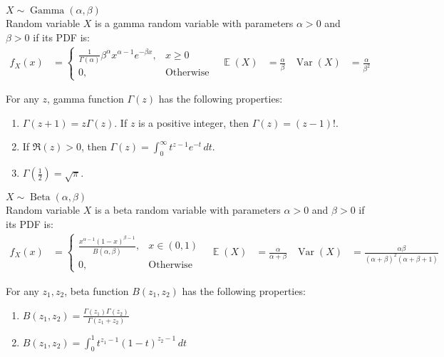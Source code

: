 \documentclass{huhtakm-template-book-v2}
\DeclareMathOperator{\E}{\mathbb{E}}
\DeclareMathOperator{\Var}{Var}
\DeclareMathOperator{\Gam}{Gamma}
\DeclareMathOperator{\Bet}{Beta}
\begin{document}
\newpage
\begin{eg} $X\sim\Gam(\alpha,\beta)$\\
	Random variable $X$ is a gamma random variable with parameters $\alpha>0$ and $\beta>0$ if its PDF is:
	\begin{align*}
		f_{X}(x)&=\begin{cases}
			\frac{1}{\Gamma(\alpha)}\beta^{\alpha}x^{\alpha-1}e^{-\beta x}, &x\geq 0\\
			0, &\text{Otherwise}
		\end{cases} & \E(X)&=\frac{\alpha}{\beta} & \Var(X)&=\frac{\alpha}{\beta^{2}}
	\end{align*}
\end{eg}
\begin{rem}
	For any $z$, gamma function $\Gamma(z)$ has the following properties:
	\begin{enumerate}
		\item $\Gamma(z+1)=z\Gamma(z)$. If $z$ is a positive integer, then $\Gamma(z)=(z-1)!$.
		\item If $\Re(z)>0$, then $\Gamma(z)=\int_{0}^{\infty}t^{z-1}e^{-t}\,dt$.
		\item $\Gamma(\frac{1}{2})=\sqrt{\pi}$.
	\end{enumerate}
\end{rem}
\begin{eg} $X\sim\Bet(\alpha,\beta)$\\
	Random variable $X$ is a beta random variable with parameters $\alpha>0$ and $\beta>0$ if its PDF is: 
	\begin{align*}
		f_{X}(x)&=\begin{cases}
			\frac{x^{\alpha-1}(1-x)^{\beta-1}}{B(\alpha,\beta)}, &x\in(0,1)\\
			0, &\text{Otherwise}
		\end{cases} & \E(X)&=\frac{\alpha}{\alpha+\beta} & \Var(X)&=\frac{\alpha\beta}{(\alpha+\beta)^{2}(\alpha+\beta+1)}
	\end{align*}
\end{eg}
\begin{rem}
	For any $z_{1},z_{2}$, beta function $B(z_{1},z_{2})$ has the following properties:
	\begin{enumerate}
		\item $B(z_{1},z_{2})=\frac{\Gamma(z_{1})\Gamma(z_{2})}{\Gamma(z_{1}+z_{2})}$
		\item $B(z_{1},z_{2})=\int_{0}^{1}t^{z_{1}-1}(1-t)^{z_{2}-1}\,dt$
	\end{enumerate}
\end{rem}
\end{document}
